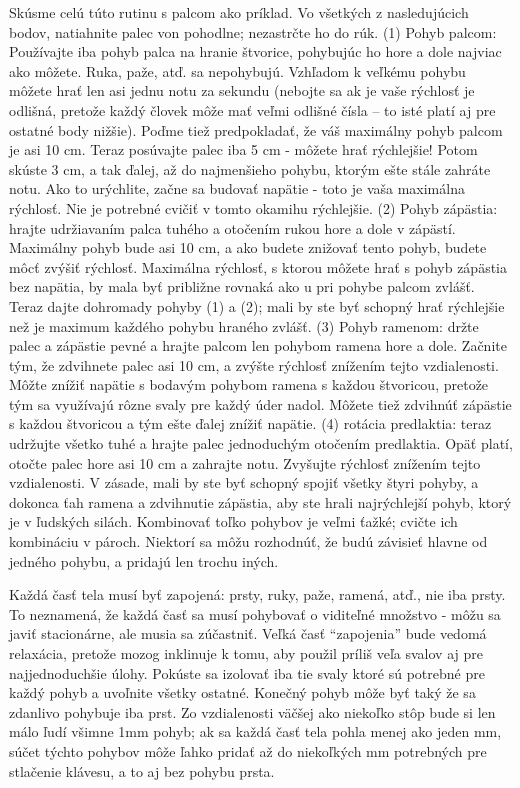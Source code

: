 Skúsme celú túto rutinu s palcom ako príklad. Vo všetkých z nasledujúcich bodov, natiahnite palec von pohodlne; nezastrčte ho do rúk. (1) Pohyb palcom: Používajte iba pohyb palca na hranie štvorice, pohybujúc ho hore a dole najviac ako môžete. Ruka, paže, atď. sa nepohybujú. Vzhľadom k veľkému pohybu môžete hrať len asi jednu notu za sekundu (nebojte sa ak je vaše rýchlosť je odlišná, pretože každý človek môže mať veľmi odlišné čísla – to isté platí aj pre ostatné body nižšie). Poďme tiež predpokladať, že váš maximálny pohyb palcom je asi 10 cm. Teraz posúvajte palec iba 5 cm - môžete hrať rýchlejšie! Potom skúste 3 cm, a tak ďalej, až do najmenšieho pohybu, ktorým ešte stále zahráte notu. Ako to urýchlite, začne sa budovať napätie - toto je vaša maximálna rýchlosť. Nie je potrebné cvičiť v tomto okamihu rýchlejšie. (2) Pohyb zápästia: hrajte udržiavaním palca tuhého a otočením rukou hore a dole v zápästí. Maximálny pohyb bude asi 10 cm, a ako budete znižovať tento pohyb, budete môcť zvýšiť rýchlosť. Maximálna rýchlosť, s ktorou môžete hrať s pohyb zápästia bez napätia, by mala byť približne rovnaká ako u pri pohybe palcom zvlášť. Teraz dajte dohromady pohyby (1) a (2); mali by ste byť schopný hrať rýchlejšie než je maximum každého pohybu hraného zvlášť. (3) Pohyb ramenom: držte palec a zápästie pevné a hrajte palcom len pohybom ramena hore a dole. Začnite tým, že zdvihnete palec asi 10 cm, a zvýšte rýchlosť znížením tejto vzdialenosti. Môžte znížiť napätie s bodavým pohybom ramena s každou štvoricou, pretože tým sa využívajú rôzne svaly pre každý úder nadol. Môžete tiež zdvihnúť zápästie s každou štvoricou a tým ešte ďalej znížiť napätie. (4) rotácia predlaktia: teraz udržujte všetko tuhé a hrajte palec jednoduchým otočením predlaktia. Opäť platí, otočte palec hore asi 10 cm a zahrajte notu. Zvyšujte rýchlosť znížením tejto vzdialenosti. V zásade, mali by ste byť schopný spojiť všetky štyri pohyby, a dokonca ťah ramena a zdvihnutie zápästia, aby ste hrali najrýchlejší pohyb, ktorý je v ľudských silách. Kombinovať toľko pohybov je veľmi ťažké; cvičte ich kombináciu v pároch. Niektorí sa môžu rozhodnúť, že budú závisieť hlavne od jedného pohybu, a pridajú len trochu iných.

Každá časť tela musí byť zapojená: prsty, ruky, paže, ramená, atď., nie iba prsty. To neznamená, že každá časť sa musí pohybovať o viditeľné množstvo - môžu sa javiť stacionárne, ale musia sa zúčastniť. Veľká časť “zapojenia” bude vedomá relaxácia, pretože mozog inklinuje k tomu, aby použil príliš veľa svalov aj pre najjednoduchšie úlohy. Pokúste sa izolovať iba tie svaly ktoré sú potrebné pre každý pohyb a uvoľnite všetky ostatné. Konečný pohyb môže byť taký že sa zdanlivo pohybuje iba prst. Zo vzdialenosti väčšej ako niekoľko stôp bude si len málo ľudí všimne 1mm pohyb; ak sa každá časť tela pohla menej ako jeden mm, súčet týchto pohybov môže ľahko pridať až do niekoľkých mm potrebných pre stlačenie klávesu, a to aj bez pohybu prsta.

